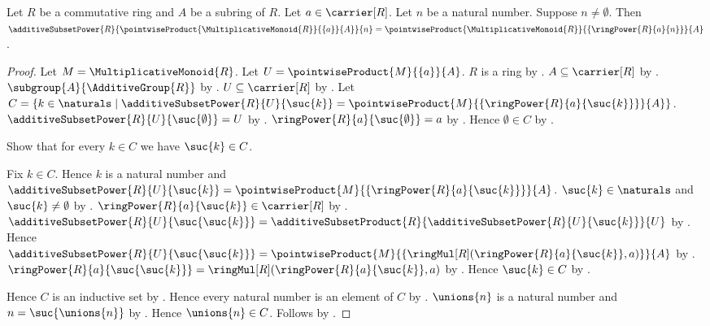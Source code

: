 \begin{theorem}\label{additive_subset_power_of_scalar_multiple}
    Let $R$ be a commutative ring and $A$ be a subring of $R$.
    Let $a\in\carrier[R]$.
    Let $n$ be a natural number.
    Suppose $n\neq\emptyset$.
    Then $\additiveSubsetPower{R}{
            \pointwiseProduct{\MultiplicativeMonoid{R}}{\{a\}}{A}}{n}
        =\pointwiseProduct{\MultiplicativeMonoid{R}}{
            \{\ringPower{R}{a}{n}\}}{A}$.
\end{theorem}
\begin{proof}
    Let $M=\MultiplicativeMonoid{R}$.
    Let $U=\pointwiseProduct{M}{\{a\}}{A}$.
    $R$ is a ring by .
    $A\subseteq\carrier[R]$ by .
    $\subgroup{A}{\AdditiveGroup{R}}$ by
        .
    $U\subseteq\carrier[R]$ by
        .
    Let $C=\{k\in\naturals\mid
        \additiveSubsetPower{R}{U}{\suc{k}}
            =\pointwiseProduct{M}{
                \{\ringPower{R}{a}{\suc{k}}\}}{A}\}$.
    $\additiveSubsetPower{R}{U}{\suc{\emptyset}}=U$ by
        .
    $\ringPower{R}{a}{\suc{\emptyset}}=a$ by
        .
    Hence $\emptyset\in C$ by .

    Show that for every $k\in C$ we have $\suc{k}\in C$.
    \begin{subproof}
        Fix $k\in C$.
        Hence $k$ is a natural number and
            $\additiveSubsetPower{R}{U}{\suc{k}}
                =\pointwiseProduct{M}{
                    \{\ringPower{R}{a}{\suc{k}}\}}{A}$.
        $\suc{k}\in\naturals$ and $\suc{k}\neq\emptyset$ by
            .
        $\ringPower{R}{a}{\suc{k}}\in\carrier[R]$ by
            .
        $\additiveSubsetPower{R}{U}{\suc{\suc{k}}}
            =\additiveSubsetProduct{R}{
                \additiveSubsetPower{R}{U}{\suc{k}}}{U}$ by
            .
        Hence $\additiveSubsetPower{R}{U}{\suc{\suc{k}}}
            =\pointwiseProduct{M}{
                \{\ringMul[R](\ringPower{R}{a}{\suc{k}},a)\}}{A}$ by
            .
        $\ringPower{R}{a}{\suc{\suc{k}}}
            =\ringMul[R](\ringPower{R}{a}{\suc{k}},a)$ by
            .
        Hence $\suc{k}\in C$ by .
    \end{subproof}
    Hence $C$ is an inductive set by .
    Hence every natural number is an element of $C$ by
        .
    $\unions{n}$ is a natural number and $n=\suc{\unions{n}}$ by
        .
    Hence $\unions{n}\in C$.
    Follows by \auto.
\end{proof}

